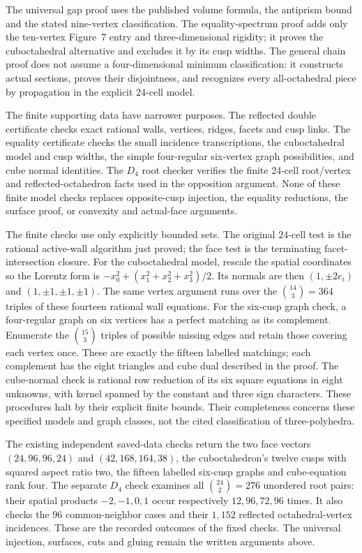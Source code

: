 \documentclass[11pt]{article}
\theoremstyle{remark}
\begin{document}
The universal gap proof uses the published volume formula, the
antiprism bound and the stated nine-vertex classification. The
equality-spectrum proof adds only the ten-vertex Figure~7 entry and
three-dimensional rigidity; it proves the cuboctahedral alternative
and excludes it by its cusp widths. The general chain proof does
not assume a four-dimensional minimum classification: it constructs
actual sections, proves their disjointness, and recognizes every
all-octahedral piece by propagation in the explicit 24-cell model.

The finite supporting data have narrower purposes. The reflected
double certificate checks exact rational walls, vertices, ridges,
facets and cusp links. The equality certificate checks the small
incidence transcriptions, the cuboctahedral model and cusp widths,
the simple four-regular six-vertex graph possibilities, and cube
normal identities. The $D_4$ root checker verifies the finite
24-cell root/vertex and reflected-octahedron facts used in the
opposition argument. None of these finite model checks replaces
opposite-cusp injection, the equality reductions, the surface proof,
or convexity and actual-face arguments.

The finite checks use only explicitly bounded sets. The original
$24$-cell test is the rational active-wall algorithm just proved;
the face test is the terminating facet-intersection closure. For the
cuboctahedral model, rescale the spatial coordinates so the Lorentz
form is $-x_0^2+(x_1^2+x_2^2+x_3^2)/2$. Its normals are then
$(1,\pm2e_i)$ and $(1,\pm1,\pm1,\pm1)$. The same vertex argument
runs over the $\binom{14}{3}=364$ triples of these fourteen rational
wall equations. For the six-cusp graph check, a
four-regular graph on six vertices has a perfect matching as its
complement. Enumerate the $\binom{15}{3}$ triples of possible missing
edges and retain those covering each vertex once. These are exactly
the fifteen labelled matchings; each complement has the eight
triangles and cube dual described in the proof. The cube-normal
check is rational row reduction of its six square equations in
eight unknowns, with kernel spanned by the constant and three sign
characters. These procedures halt by their explicit finite bounds.
Their completeness concerns these specified models and graph classes,
not the cited classification of three-polyhedra.

The existing independent saved-data checks return the two face vectors
$(24,96,96,24)$ and $(42,168,164,38)$, the cuboctahedron's twelve
cusps with squared aspect ratio two, the fifteen labelled six-cusp
graphs and cube-equation rank four. The separate $D_4$ check examines
all $\binom{24}{2}=276$ unordered root pairs: their spatial products
$-2,-1,0,1$ occur respectively $12,96,72,96$ times. It also checks
the $96$ common-neighbor cases and their $1,152$ reflected
octahedral-vertex incidences. These are the recorded outcomes of
the fixed checks. The universal injection, surfaces, cuts and gluing
remain the written arguments above.
\end{document}
